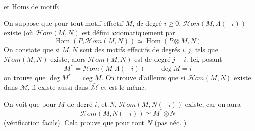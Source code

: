 \uline{ et Homs de motifs}

On suppose que pour tout motif effectif $M$, de degré $i\geq0$, $\mathcal Hom(M,\Lambda(-i))$ existe (où $\mathcal Hom(M,N)$ est défini axiomatiquement par
\[
\operatorname{Hom}(P,\mathcal Hom(M,N))\simeq\operatorname{Hom}(P\otimes M,N)
\]
On constate que si $M,N$ sont des motifs effectifs de degrés $i,j$, tels que $\mathcal Hom(M,N)$ existe, alors $\mathcal Hom(M,N)$ est de degré $j-i$. Ici, posant
\[
M^{*}=\mathcal Hom(M,\Lambda(-i))\qquad\deg M=i
\]
on trouve que $\deg M^{*}=\deg M$. On trouve d'ailleurs que si $\mathcal Hom(M,N)$ existe dans $\mathcal M$, il existe aussi dans $\widehat{\mathcal M}$ et est le même.

On voit que pour  $M$ de degré $i$, et  $N$, $\mathcal Hom(M,N(-i))$ existe, car on aura
\[
\mathcal Hom(M,N(-i))\simeq M^{*}\otimes N
\]
(vérification facile).  Cela prouve que pour tout $N$ (pas néc. )
